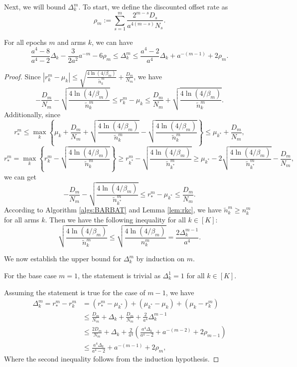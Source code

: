 Next, we will bound $\Delta_k^m$. To start, we define the discounted offset rate as
\[\rho_m := \sum_{s=1}^m \frac{2^{m-s}D_s}{a^{4(m-s)}N_s}.\]
\begin{lemma}
\label{lem:bsgbb}
    For all epochs $m$ and arms $k$, we can have
     \[\frac{a^4 - 8}{a^4 - 2}\Delta_k - \frac{3}{2a^2}a^{-m} - 6\rho_m \leq \Delta_k^{m} \leq \frac{a^4 - 2}{a^4}\Delta_k + a^{-(m-1)} + 2\rho_m.\]
\end{lemma}
\begin{proof}
    Since $|r_k^m - \mu_k| \leq \sqrt{\frac{4\ln(4 /\beta_m)}{\widetilde{n}_k^m}} + \frac{D_m}{N_m}$, we have
    \[-\frac{D_m}{N_m} - \sqrt{\frac{4\ln(4 /\beta_m)}{\widetilde{n}_k^m}} \leq r_{k}^m - \mu_{k} \leq \frac{D_m}{N_m} + \sqrt{\frac{4\ln(4 /\beta_m)}{\widetilde{n}_k^m}}.\]
    Additionally, since
    \[r_{*}^m \leq \max_k \left\{\mu_{k} + \frac{D_m}{N_m} + \sqrt{\frac{4\ln(4 /\beta_m)}{\widetilde{n}_k^m}} - \sqrt{\frac{4\ln(4 /\beta_m)}{\widetilde{n}_k^m}}\right\} \leq \mu_{k^*} + \frac{D_m}{N_m},\]
    \[r_{*}^m = \max_k \left\{r_k^m - \sqrt{\frac{4\ln(4 /\beta_m)}{\widetilde{n}_k^m}}\right\} \geq r_{k^*}^m - \sqrt{\frac{4\ln(4 /\beta_m)}{\widetilde{n}_{k^*}^m}} \geq \mu_{k^*} - 2\sqrt{\frac{4\ln(4 /\beta_m)}{\widetilde{n}_{k^*}^m}} - \frac{D_m}{N_m},\]
    we can get
    \[-\frac{D_m}{N_m} - \sqrt{\frac{4\ln(4 /\beta_m)}{\widetilde{n}_{k^*}^m}} \leq r_{*}^m - \mu_{k^*} \leq \frac{D_m}{N_m}.\]
    According to Algorithm \ref{algs:BARBAT} and Lemma \ref{lem:rkc}, we have $\widetilde{n}_k^m \geq n_k^m$ for all arms $k$. Then we have the following inequality for all $k\in [K]$:
    \[\sqrt{\frac{4\ln(4 /\beta_m)}{\widetilde{n}_k^m}} \leq \sqrt{\frac{4\ln(4 /\beta_m)}{n_k^m}} = \frac{2\Delta_k^{m-1}}{a^4}.\]

    We now establish the upper bound for $\Delta_k^m$ by induction on $m$.
    
    For the base case $m = 1$, the statement is trivial as $\Delta_k^1 = 1$ for all $k \in [K]$.
    
    Assuming the statement is true for the case of $m-1$, we have
    \begin{equation*}
    \begin{split}
        \Delta_k^m = r_*^m - r_k^m
        &= (r_*^m - \mu_{k^*}) + (\mu_{k^*} - \mu_k) + (\mu_k - r_k^m) \\
        &\leq \frac{D_m}{N_m}+ \Delta_k + \frac{D_m}{N_m} + \frac{2}{a^4}\Delta_k^{m-1} \\
        &\leq \frac{2D_m}{N_m} + \Delta_k + \frac{2}{a^4}\left(\frac{a^4 \Delta_k}{a^4 - 2} + a^{-(m-2)} + 2\rho_{m-1}\right) \\
        &\leq \frac{a^4 \Delta_k}{a^4 - 2} + a^{-(m-1)} + 2\rho_m,
    \end{split}
    \end{equation*}
    Where the second inequality follows from the induction hypothesis.
     

\end{proof}
